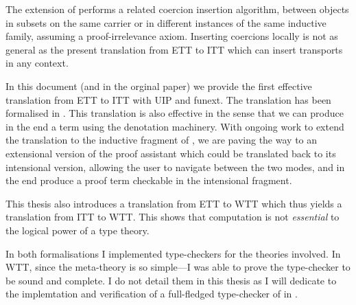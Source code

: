 The   extension of \Coq performs a
related coercion insertion algorithm, between objects in subsets on the
same carrier or in different instances of the same inductive family,
assuming a proof-irrelevance axiom. Inserting coercions locally is not
as general as the present translation from \acrshort{ETT} to \acrshort{ITT}
which can insert transports in any context.

In this document (and in the orginal paper) we provide the first effective
translation from \acrshort{ETT} to \acrshort{ITT} with \acrshort{UIP} and
\acrshort{funext}. The translation has been formalised in \Coq.
This translation is also effective in the sense that we can produce in the end a
\Coq term using the \MetaCoq denotation machinery.
%
With ongoing work to extend the translation to the inductive fragment
of \Coq, we are paving the way to an extensional version of the \Coq
proof assistant which could be translated back to its intensional
version, allowing the user to navigate between the two modes, and in
the end produce a proof term checkable in the intensional fragment.

This thesis also introduces a translation from \acrshort{ETT} to \acrshort{WTT}
which thus yields a translation from \acrshort{ITT} to \acrshort{WTT}. This
shows that computation is not \emph{essential} to the logical power of a type
theory.

In both formalisations I implemented type-checkers for the theories involved.
In \acrshort{WTT}, since the meta-theory is so simple---I was able to prove the
type-checker to be sound and complete. I do not detail them in this thesis as
I will dedicate  to the implemtation and verification of
a full-fledged type-checker of \Coq in \Coq.